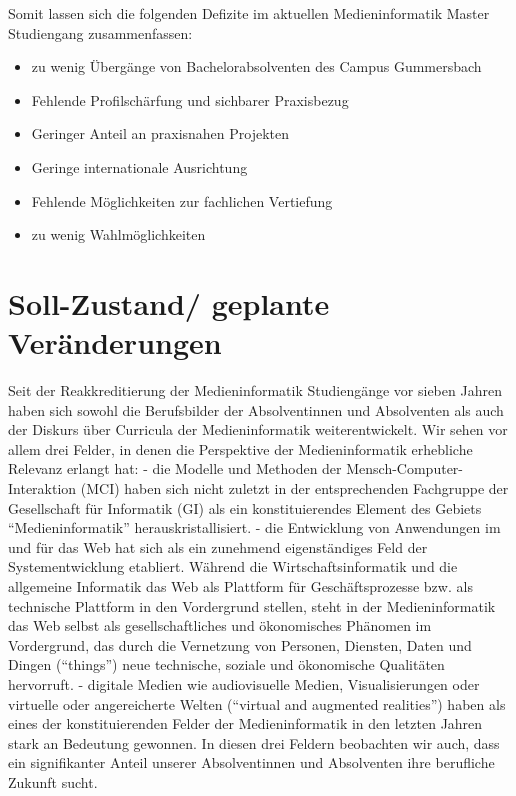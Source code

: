 Somit lassen sich die folgenden Defizite im aktuellen Medieninformatik
Master Studiengang zusammenfassen:

\begin{itemize}
\tightlist
\item
  zu wenig Übergänge von Bachelorabsolventen des Campus Gummersbach
\item
  Fehlende Profilschärfung und sichbarer Praxisbezug
\item
  Geringer Anteil an praxisnahen Projekten
\item
  Geringe internationale Ausrichtung
\item
  Fehlende Möglichkeiten zur fachlichen Vertiefung
\item
  zu wenig Wahlmöglichkeiten
\end{itemize}

\chapter{Soll-Zustand/ geplante
Veränderungen}\label{soll-zustand-geplante-veruxe4nderungen}

Seit der Reakkreditierung der Medieninformatik Studiengänge vor sieben
Jahren haben sich sowohl die Berufsbilder der Absolventinnen und
Absolventen als auch der Diskurs über Curricula der Medieninformatik
weiterentwickelt. Wir sehen vor allem drei Felder, in denen die
Perspektive der Medieninformatik erhebliche Relevanz erlangt hat: - die
Modelle und Methoden der Mensch-Computer-Interaktion (MCI) haben sich
nicht zuletzt in der entsprechenden Fachgruppe der Gesellschaft für
Informatik (GI) als ein konstituierendes Element des Gebiets
``Medieninformatik'' herauskristallisiert. - die Entwicklung von
Anwendungen im und für das Web hat sich als ein zunehmend eigenständiges
Feld der Systementwicklung etabliert. Während die Wirtschaftsinformatik
und die allgemeine Informatik das Web als Plattform für
Geschäftsprozesse bzw. als technische Plattform in den Vordergrund
stellen, steht in der Medieninformatik das Web selbst als
gesellschaftliches und ökonomisches Phänomen im Vordergrund, das durch
die Vernetzung von Personen, Diensten, Daten und Dingen (``things'')
neue technische, soziale und ökonomische Qualitäten hervorruft. -
digitale Medien wie audiovisuelle Medien, Visualisierungen oder
virtuelle oder angereicherte Welten (``virtual and augmented
realities'') haben als eines der konstituierenden Felder der
Medieninformatik in den letzten Jahren stark an Bedeutung gewonnen. In
diesen drei Feldern beobachten wir auch, dass ein signifikanter Anteil
unserer Absolventinnen und Absolventen ihre berufliche Zukunft sucht.

